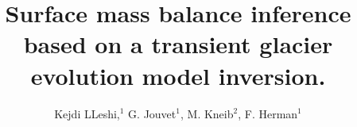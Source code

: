 \documentclass[review,jog]{igs}
\newcommand\dirbiblio{BIBLIO}
\begin{document}
 

	\title[Smb inference]{Surface mass balance inference based on a transient glacier evolution model inversion.}
	

	\author[LLeshi and others]{Kejdi LLeshi,$^1$ G. Jouvet$^{1}$, M. Kneib$^{2}$, F. Herman$^{1}$}
		
 
 
	\begin{frontmatter}

\maketitle




\end{frontmatter}
 
\captionsetup[subfigure]{labelformat=simple,labelsep=space}
\renewcommand\thesubfigure{\alph{subfigure}}

 
 






% 
%
\newpage

% 
% 
% 
\end{document}

